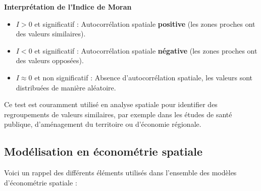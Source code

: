\documentclass[
]{article}
\begin{document}
\textbf{Interprétation de l’Indice de Moran}

\begin{itemize}
    \item \( I > 0 \) et significatif : Autocorrélation spatiale \textbf{positive} (les zones proches ont des valeurs similaires).
    \item \( I < 0 \) et significatif : Autocorrélation spatiale \textbf{négative} (les zones proches ont des valeurs opposées).
    \item \( I \approx 0 \) et non significatif : Absence d’autocorrélation spatiale, les valeurs sont distribuées de manière aléatoire.
\end{itemize}

Ce test est couramment utilisé en analyse spatiale pour identifier des
regroupements de valeurs similaires, par exemple dans les études de
santé publique, d'aménagement du territoire ou d'économie régionale.

\subsection{Modélisation en économétrie
spatiale}\label{moduxe9lisation-en-uxe9conomuxe9trie-spatiale}

Voici un rappel des différents éléments utilisés dans l'ensemble des
modèles d'économétrie spatiale :
\end{document}
